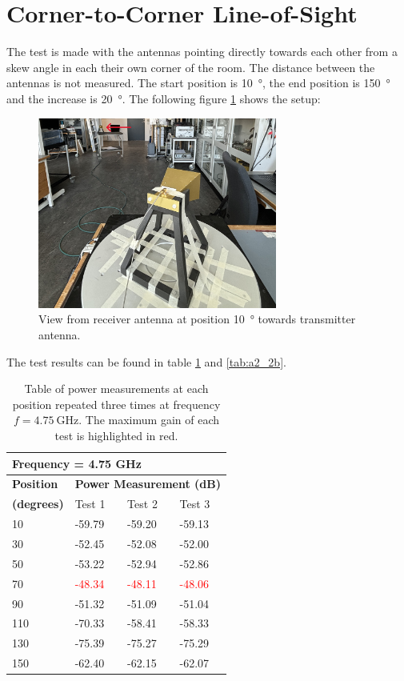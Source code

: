 \section{Corner-to-Corner Line-of-Sight} \label{s:test2}
The test is made with the antennas pointing directly towards each other from a skew angle in each their own corner of the room. The distance between the antennas is not measured. The start position is \SI{10}{\degree}, the end position is \SI{150}{\degree} and the increase is \SI{20}{\degree}. The following figure \ref{fig:a2_2} shows the setup:
\begin{figure}[H]
    \centering
    \includegraphics[width=0.7\textwidth]{figures/test_los_corner.JPG}
    \caption{View from receiver antenna at position \SI{10}{\degree} towards transmitter antenna.} \label{fig:a2_2}
\end{figure}

The test results can be found in table \ref{tab:a2_2a} and \ref{tab:a2_2b}.
\begin{table}[H]
    \centering
    \begin{tabular}{l|l|l|l}
        \multicolumn{4}{l}{\textbf{Frequency = 4.75 GHz}}         \\
        \hline
        \textbf{Position} & \multicolumn{3}{l}{\textbf{Power Measurement (dB)}} \\
        \textbf{(degrees)}  & Test 1    & Test 2  & Test 3  \\
        \hline
        \hline
        10      & -59.79    & -59.20    & -59.13 \\
        30      & -52.45    & -52.08    & -52.00 \\
        50      & -53.22    & -52.94    & -52.86 \\
        70      & \textcolor{red}{-48.34}    & \textcolor{red}{-48.11}    & \textcolor{red}{-48.06} \\
        90      & -51.32    & -51.09    & -51.04 \\
        110     & -70.33    & -58.41    & -58.33 \\
        130     & -75.39    & -75.27    & -75.29 \\
        150     & -62.40    & -62.15    & -62.07
        \end{tabular}
    \caption{Table of power measurements at each position repeated three times at frequency $f=\SI{4.75}{\giga\hertz}$. The maximum gain of each test is highlighted in red.}
    \label{tab:a2_2a}
\end{table}

